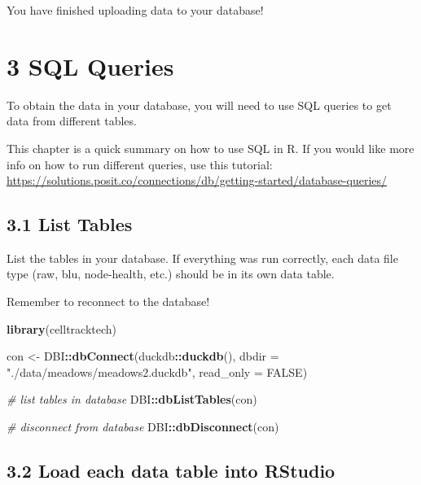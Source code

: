 \documentclass[
]{book}
\newenvironment{Shaded}{\begin{snugshade}}{\end{snugshade}}
\newcommand{\AttributeTok}[1]{\textcolor[rgb]{0.13,0.29,0.53}{#1}}
\newcommand{\CommentTok}[1]{\textcolor[rgb]{0.56,0.35,0.01}{\textit{#1}}}
\newcommand{\ConstantTok}[1]{\textcolor[rgb]{0.56,0.35,0.01}{#1}}
\newcommand{\FunctionTok}[1]{\textcolor[rgb]{0.13,0.29,0.53}{\textbf{#1}}}
\newcommand{\NormalTok}[1]{#1}
\newcommand{\OtherTok}[1]{\textcolor[rgb]{0.56,0.35,0.01}{#1}}
\newcommand{\SpecialCharTok}[1]{\textcolor[rgb]{0.81,0.36,0.00}{\textbf{#1}}}
\newcommand{\StringTok}[1]{\textcolor[rgb]{0.31,0.60,0.02}{#1}}
\begin{document}
You have finished uploading data to your database!

\chapter{3 SQL Queries}\label{sql-queries}

To obtain the data in your database, you will need to use SQL queries to get data from different tables.

This chapter is a quick summary on how to use SQL in R. If you would like more info on how to run different queries, use this tutorial: \url{https://solutions.posit.co/connections/db/getting-started/database-queries/}

\section{3.1 List Tables}\label{list-tables}

List the tables in your database. If everything was run correctly, each data file type (raw, blu, node-health, etc.) should be in its own data table.

Remember to reconnect to the database!

\begin{Shaded}
\begin{Highlighting}[]
\FunctionTok{library}\NormalTok{(celltracktech)}

\NormalTok{con }\OtherTok{\textless{}{-}}\NormalTok{ DBI}\SpecialCharTok{::}\FunctionTok{dbConnect}\NormalTok{(duckdb}\SpecialCharTok{::}\FunctionTok{duckdb}\NormalTok{(), }
                      \AttributeTok{dbdir =} \StringTok{"./data/meadows/meadows2.duckdb"}\NormalTok{, }
                      \AttributeTok{read\_only =} \ConstantTok{FALSE}\NormalTok{)}

\CommentTok{\# list tables in database}
\NormalTok{DBI}\SpecialCharTok{::}\FunctionTok{dbListTables}\NormalTok{(con)}

\CommentTok{\# disconnect from database}
\NormalTok{DBI}\SpecialCharTok{::}\FunctionTok{dbDisconnect}\NormalTok{(con)}
\end{Highlighting}
\end{Shaded}

\section{3.2 Load each data table into RStudio}\label{load-each-data-table-into-rstudio}
\end{document}
